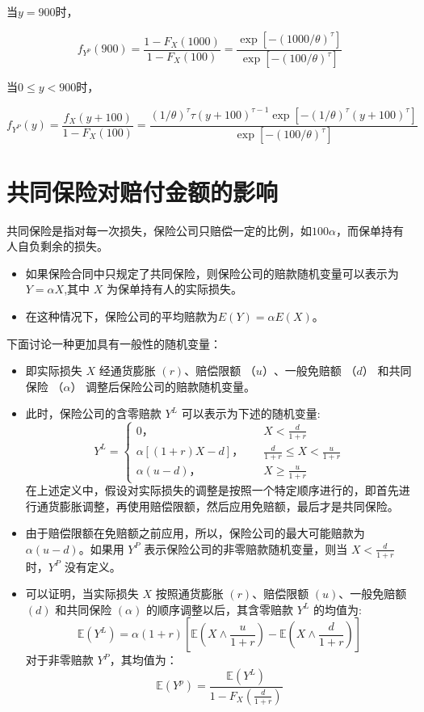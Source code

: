 \documentclass[
]{book}
\begin{document}
当\(y = 900\)时，

\[
{{f}_{{{Y}^{p}}}}(900)=\frac{1-{{F}_{X}}(1000)}{1-{{F}_{X}}(100)}=\frac{\exp [-{{(1000/ \theta )}^{\tau }}]}{\exp [-{{(100/ \theta )}^{\tau }}]}
\]

当\(0\le y<900\)时，

\[
{{f}_{{{Y}^{P}}}}(y)=\frac{{{f}_{X}}(y+100)}{1-{{F}_{X}}(100)}=\frac{{{(1/\theta) }^{\tau }}\tau {{(y+100)}^{\tau -1}}\exp [-{{(1/\theta) }^{\tau }}{{(y+100)}^{\tau }}]}{\exp [-{{(100/ \theta )}^{\tau }}]}
\]

\hypertarget{ux5171ux540cux4fddux9669ux5bf9ux8d54ux4ed8ux91d1ux989dux7684ux5f71ux54cd}{%
\section{共同保险对赔付金额的影响}\label{ux5171ux540cux4fddux9669ux5bf9ux8d54ux4ed8ux91d1ux989dux7684ux5f71ux54cd}}

共同保险是指对每一次损失，保险公司只赔偿一定的比例，如\(100\alpha%
\)，而保单持有人自负剩余的损失。

\begin{itemize}
\item
  如果保险合同中只规定了共同保险，则保险公司的赔款随机变量可以表示为\(Y=\alpha X\),其中 \(X\) 为保单持有人的实际损失。
\item
  在这种情况下，保险公司的平均赔款为\(E(Y)=\alpha E(X)\)。
\end{itemize}

下面讨论一种更加具有一般性的随机变量：

\begin{itemize}
\item
  即实际损失 \(X\) 经通货膨胀 \((r)\)、赔偿限额 \(（u）\)、一般免赔额 \(（d）\) 和共同保险 \(（\alpha）\) 调整后保险公司的赔款随机变量。
\item
  此时，保险公司的含零赔款 \(Y^L\) 可以表示为下述的随机变量:
  \[
  Y^L=\begin{cases}
  0，\quad & X<\frac{d}{1+r}\\
  \alpha[(1+r)X-d]， \quad & \frac{d}{1+r}\le X < \frac{u}{1+r}\\
  \alpha(u-d)，\quad & X \ge \frac{u}{1+r}
  \end{cases}
  \]
  在上述定义中，假设对实际损失的调整是按照一个特定顺序进行的，即首先进行通货膨胀调整，再使用赔偿限额，然后应用免赔额，最后才是共同保险。
\item
  由于赔偿限额在免赔额之前应用，所以，保险公司的最大可能赔款为\(\alpha(u-d)\)。如果用 \(Y^P\) 表示保险公司的非零赔款随机变量，则当 \(X < \frac{d}{1+r}\) 时，\(Y^P\) 没有定义。
\item
  可以证明，当实际损失 \(X\) 按照通货膨胀 \((r)\)、赔偿限额 \((u)\)、一般免赔额 \((d)\) 和共同保险 \((α)\) 的顺序调整以后，其含零赔款 \(Y^L\) 的均值为:
  \[
  \mathbb{E}(Y^L)=\alpha(1+r)\left[
  \mathbb{E}\left(X \wedge \frac{u}{1+r}\right)-
  \mathbb{E}\left(X \wedge \frac{d}{1+r}\right)
  \right]
  \]
  对于非零赔款 \(Y^P\)，其均值为：
  \[
  \mathbb{E}(Y^p) = \frac{\mathbb{E}(Y^L)}{1-F_X\left(\frac{d}{1+r} \right)}
  \]
\end{itemize}
\end{document}
